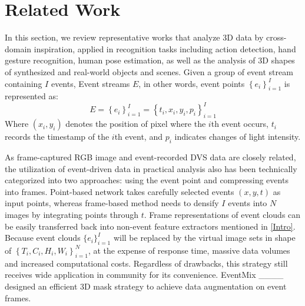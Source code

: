 \section{Related Work}
\label{related}
In this section, we review representative works that analyze 3D data by cross-domain inspiration, applied in recognition tasks including action detection, hand gesture recognition, human pose estimation, as well as the analysis of 3D shapes of synthesized and real-world objects and scenes. Given a group of event stream containing $I$ events, Event streams $E$, in other words, event points $\left\{e_i\right\}^{I}_{i=1}$ is represented as:
\begin{equation}\label{dvs_data}
    E = \left\{e_i\right\}^{I}_{i=1} = \left\{t_i,x_i,y_i,p_i \right\}_{i=1}^I
\end{equation} 
Where $(x_i,y_i)$ denotes the position of pixel where the $i$th event occurs, $t_i$ records the timestamp of the $i$th event, and $p_i$ indicates changes of light intensity. 

As frame-captured RGB image and event-recorded DVS data are closely related, the utilization of event-driven data in practical analysis also has been technically categorized into two approaches: using the event point and compressing events into frames. Point-based network takes carefully selected events $(x,y,t)$ as input points, whereas frame-based method needs to densify $I$ events into $N$ images by integrating points through $t$. Frame representations of event clouds can be easily transferred back into non-event feature extractors mentioned in \cref{Intro}. Because event clouds $\{e_i\}_{i=1}^I$ will be replaced by the virtual image sets in shape of $\left\{T_i, C_i, H_i, W_i\right\}_{i=1}^N$, at the expense of response time, massive data volumes and increased computational costs. Regardless of drawbacks, this strategy still receives wide application in community for its convenience. EventMix ____ designed an efficient 3D mask strategy to achieve data augmentation on event frames.
